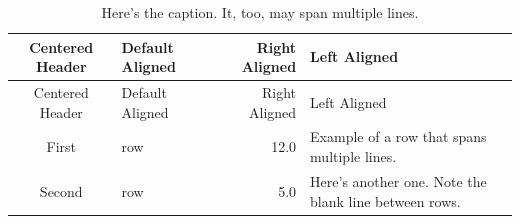 \documentclass[]{article}
\begin{document}
\begin{longtable}[]{@{}clrl@{}}
\caption{Here's the caption. It, too, may span multiple
lines.}\tabularnewline
\toprule
\begin{minipage}[b]{0.15\columnwidth}\centering\strut
Centered Header
\strut\end{minipage} &
\begin{minipage}[b]{0.10\columnwidth}\raggedright\strut
Default Aligned
\strut\end{minipage} &
\begin{minipage}[b]{0.20\columnwidth}\raggedleft\strut
Right Aligned
\strut\end{minipage} &
\begin{minipage}[b]{0.31\columnwidth}\raggedright\strut
Left Aligned
\strut\end{minipage}\tabularnewline
\midrule
\endfirsthead
\toprule
\begin{minipage}[b]{0.15\columnwidth}\centering\strut
Centered Header
\strut\end{minipage} &
\begin{minipage}[b]{0.10\columnwidth}\raggedright\strut
Default Aligned
\strut\end{minipage} &
\begin{minipage}[b]{0.20\columnwidth}\raggedleft\strut
Right Aligned
\strut\end{minipage} &
\begin{minipage}[b]{0.31\columnwidth}\raggedright\strut
Left Aligned
\strut\end{minipage}\tabularnewline
\midrule
\endhead
\begin{minipage}[t]{0.15\columnwidth}\centering\strut
First
\strut\end{minipage} &
\begin{minipage}[t]{0.10\columnwidth}\raggedright\strut
row
\strut\end{minipage} &
\begin{minipage}[t]{0.20\columnwidth}\raggedleft\strut
12.0
\strut\end{minipage} &
\begin{minipage}[t]{0.31\columnwidth}\raggedright\strut
Example of a row that spans multiple lines.
\strut\end{minipage}\tabularnewline
\begin{minipage}[t]{0.15\columnwidth}\centering\strut
Second
\strut\end{minipage} &
\begin{minipage}[t]{0.10\columnwidth}\raggedright\strut
row
\strut\end{minipage} &
\begin{minipage}[t]{0.20\columnwidth}\raggedleft\strut
5.0
\strut\end{minipage} &
\begin{minipage}[t]{0.31\columnwidth}\raggedright\strut
Here's another one. Note the blank line between rows.
\strut\end{minipage}\tabularnewline
\bottomrule
\end{longtable}
\end{document}
